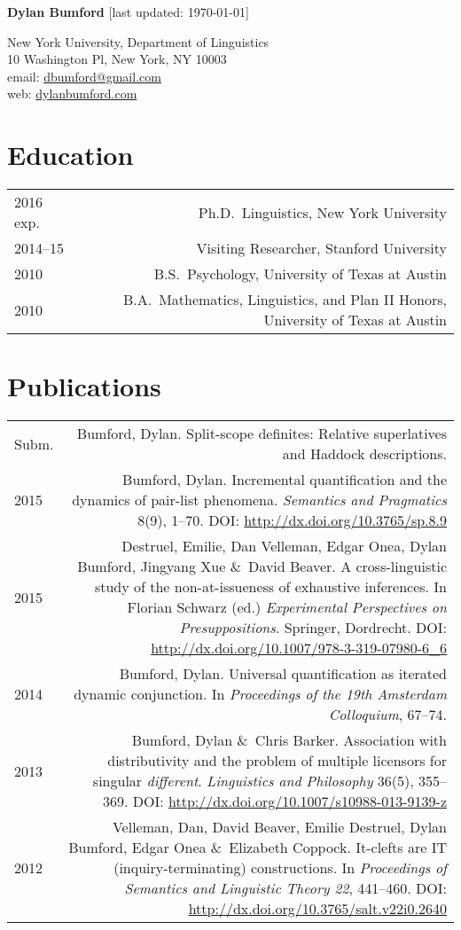\documentclass[11pt]{article}
\newcommand{\doi}[1]{\url{http://dx.doi.org/#1}}
\newcommand{\with}{\&}
\begin{document}
\textbf{Dylan Bumford}\hfill
{\color{gray}[last updated: \today]}

\bigskip

New York University, Department of Linguistics\\
10 Washington Pl, New York, NY 10003\\
email: \href{mailto:dbumford@gmail.com}{dbumford@gmail.com}\\
web: \url{dylanbumford.com}


\section*{Education}

\begin{longtable}{LR}
  2016 exp.   & Ph.D.~Linguistics, New York University\\
  2014--15    & Visiting Researcher, Stanford University\\
  2010        & B.S.~Psychology, University of Texas at Austin\\
  2010        & B.A.~Mathematics, Linguistics, and Plan II Honors, University of
                Texas at Austin
\end{longtable}

\section*{Publications}

\begin{longtable}{LR}
  Subm. & Bumford, Dylan. Split-scope definites: Relative superlatives and
          Haddock descriptions.\\
  2015  & Bumford, Dylan. Incremental quantification and the dynamics of
          pair-list phenomena. \textit{Semantics and Pragmatics} 8(9), 1--70.
          DOI: \doi{10.3765/sp.8.9}\\
  2015  & Destruel, Emilie, Dan Velleman, Edgar Onea, Dylan Bumford, Jingyang Xue
          \with~David Beaver. A cross-linguistic study of the non-at-issueness
          of exhaustive inferences. In Florian Schwarz (ed.)
          \textit{Experimental Perspectives on Presuppositions}. Springer,
          Dordrecht. DOI: \doi{10.1007/978-3-319-07980-6_6}\\
  2014  & Bumford, Dylan. Universal quantification as iterated dynamic
          conjunction. In \textit{Proceedings of the 19th Amsterdam
          Colloquium}, 67--74.\\
  2013  & Bumford, Dylan \with~Chris Barker. Association with distributivity
          and the problem of multiple licensors for singular
          \textit{different}. \textit{Linguistics and Philosophy} 36(5),
          355--369. DOI: \doi{10.1007/s10988-013-9139-z}\\ %
  2012  & Velleman, Dan, David Beaver, Emilie Destruel, Dylan Bumford, Edgar
          Onea \with~Elizabeth Coppock. It-clefts are IT (inquiry-terminating)
          constructions. In \textit{Proceedings of Semantics and Linguistic
          Theory 22}, 441--460. DOI: \doi{10.3765/salt.v22i0.2640}
\end{longtable}
\end{document}
